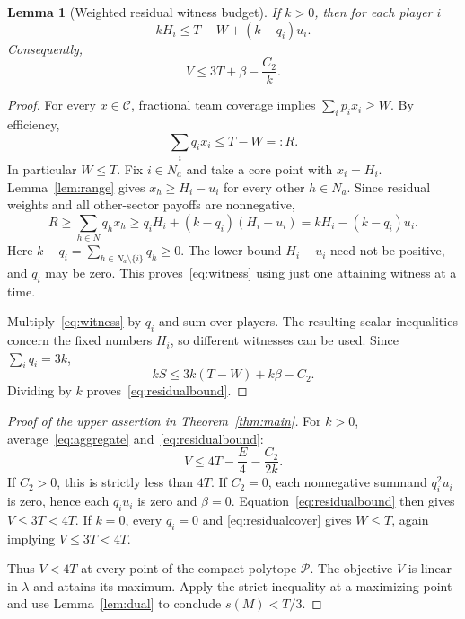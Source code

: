 \documentclass[11pt]{article}
\newtheorem{lemma}[theorem]{Lemma}
\theoremstyle{remark}
\newcommand{\core}{\mathcal C}
\newcommand{\pack}{\mathcal P}
\begin{document}
\begin{lemma}[Weighted residual witness budget]\label{lem:residual}
If $k>0$, then for each player $i$
\begin{equation}\label{eq:witness}
                       kH_i\le T-W+(k-q_i)u_i.
\end{equation}
Consequently,
\begin{equation}\label{eq:residualbound}
                         V\le3T+\beta-\frac{C_2}{k}.
\end{equation}
\end{lemma}
\begin{proof}
For every $x\in\core$, fractional team coverage implies
$\sum_ip_ix_i\ge W$. By efficiency,
\begin{equation}\label{eq:residualcover}
                       \sum_iq_ix_i\le T-W=:R.
\end{equation}
In particular $W\le T$. Fix $i\in N_a$ and take a core point with
$x_i=H_i$. Lemma~\ref{lem:range} gives $x_h\ge H_i-u_i$ for every
other $h\in N_a$. Since residual weights and all other-sector payoffs
are nonnegative,
\[
 R\ge\sum_{h\in N}q_hx_h\ge q_iH_i+(k-q_i)(H_i-u_i)
                         =kH_i-(k-q_i)u_i.
\]
Here $k-q_i=\sum_{h\in N_a\setminus\{i\}}q_h\ge0$. The lower bound
$H_i-u_i$ need not be positive, and $q_i$ may be zero.
This proves~\eqref{eq:witness} using just one attaining witness at a time.

Multiply~\eqref{eq:witness} by $q_i$ and sum over players. The resulting
scalar inequalities concern the fixed numbers $H_i$, so different witnesses
can be used. Since $\sum_iq_i=3k$,
\[
                 kS\le3k(T-W)+k\beta-C_2.
\]
Dividing by $k$ proves~\eqref{eq:residualbound}.
\end{proof}

\begin{proof}[Proof of the upper assertion in Theorem~\ref{thm:main}]
For $k>0$, average~\eqref{eq:aggregate} and~\eqref{eq:residualbound}:
\begin{equation}\label{eq:strictbound}
                        V\le4T-\frac E4-\frac{C_2}{2k}.
\end{equation}
If $C_2>0$, this is strictly less than $4T$. If $C_2=0$, each
nonnegative summand $q_i^2u_i$ is zero, hence each $q_iu_i$ is zero
and $\beta=0$. Equation~\eqref{eq:residualbound} then gives
$V\le3T<4T$. If $k=0$, every $q_i=0$ and
\eqref{eq:residualcover} gives $W\le T$, again implying $V\le3T<4T$.

Thus $V<4T$ at every point of the compact polytope $\pack$.
The objective $V$ is linear in $\lambda$ and attains its maximum.
Apply the strict inequality at a maximizing point and use
Lemma~\ref{lem:dual} to conclude $s(M)<T/3$.
\end{proof}
\end{document}
